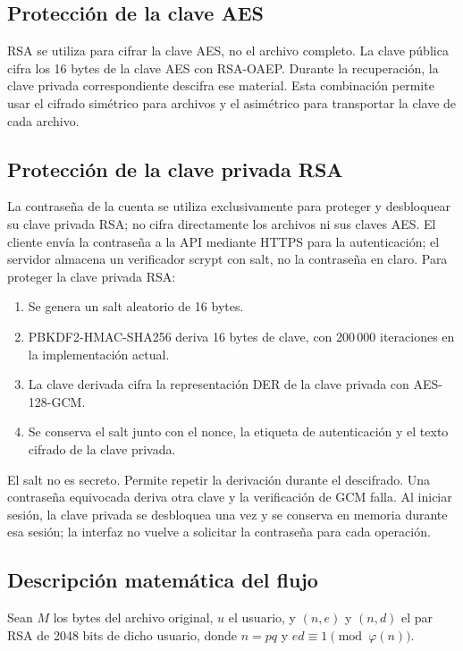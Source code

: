 \documentclass[12pt,a4paper]{article}
\begin{document}
\subsection{Protección de la clave AES}

RSA se utiliza para cifrar la clave AES, no el archivo completo. La clave pública cifra los 16 bytes de la clave AES con RSA-OAEP. Durante la recuperación, la clave privada correspondiente descifra ese material. Esta combinación permite usar el cifrado simétrico para archivos y el asimétrico para transportar la clave de cada archivo.

\subsection{Protección de la clave privada RSA}

La contraseña de la cuenta se utiliza exclusivamente para proteger y desbloquear su clave privada RSA; no cifra directamente los archivos ni sus claves AES. El cliente envía la contraseña a la API mediante HTTPS para la autenticación; el servidor almacena un verificador scrypt con salt, no la contraseña en claro. Para proteger la clave privada RSA:

\begin{enumerate}
    \item Se genera un salt aleatorio de 16 bytes.
    \item PBKDF2-HMAC-SHA256 deriva 16 bytes de clave, con 200\,000 iteraciones en la implementación actual.
    \item La clave derivada cifra la representación DER de la clave privada con AES-128-GCM.
    \item Se conserva el salt junto con el nonce, la etiqueta de autenticación y el texto cifrado de la clave privada.
\end{enumerate}

El salt no es secreto. Permite repetir la derivación durante el descifrado. Una contraseña equivocada deriva otra clave y la verificación de GCM falla. Al iniciar sesión, la clave privada se desbloquea una vez y se conserva en memoria durante esa sesión; la interfaz no vuelve a solicitar la contraseña para cada operación.

\subsection{Descripción matemática del flujo}

Sean $M$ los bytes del archivo original, $u$ el usuario, y $(n,e)$ y $(n,d)$ el par RSA de 2048 bits de dicho usuario, donde $n=pq$ y $ed\equiv 1 \pmod{\varphi(n)}$.
\end{document}
